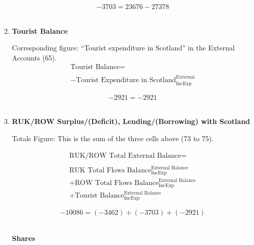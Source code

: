 \begin{enumerate}
\begin{equation} \nonumber
-3703 = 23676-27378
\end{equation}\\


\item \textbf {Tourist Balance}

Corresponding figure: “Tourist expenditure in Scotland” in the External Accounts (65).\\

\begin{equation}
\begin{split}
\text{Tourist Balance} =  \\ \\
-\text{Tourist Expenditure in Scotland}^\text{External}_\text{IncExp}
\end{split} \label{eq:2.5.78}
\end{equation}

\begin{equation} \nonumber
-2921 = -2921
\end{equation}\\


\item \textbf {RUK/ROW Surplus/(Deficit), Lending/(Borrowing) with Scotland}

Totals Figure: This is the sum of the three cells above (73 to 75).

\begin{equation}
\begin{split}
\text{RUK/ROW Total External Balance} =  \\ \\
\text{RUK Total Flows Balance}^\text{External Balance}_\text{IncExp}\\
+\text{ROW Total Flows Balance}^\text{External Balance}_\text{IncExp}\\
+\text{Tourist Balance}^\text{External Balance}_\text{IncExp}
\end{split} \label{eq:2.5.79}
\end{equation}

\begin{equation} \nonumber
-10086 = (-3462)+(-3703)+(-2921)
\end{equation}\\

\pagebreak

\begin{center}
\textbf{\LARGE Shares}
\end{center}


\end{enumerate}
